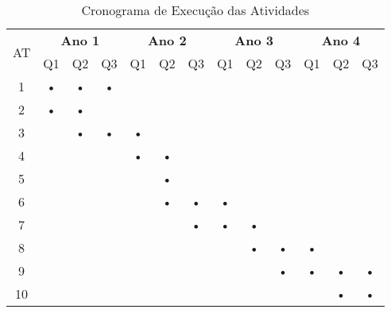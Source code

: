 \documentclass[12pt]{article}
\begin{document}
\begin{table}[htbp]
	\centering
		\begin{tabular}{|c|c|c|c|c|c|c|c|c|c|c|c|c|}
		\hline
		\multirow{2}{*}{AT} & \multicolumn{3}{c|}{\textbf{Ano 1}} & \multicolumn{3}{c|}{\textbf{Ano 2}} & \multicolumn{3}{c|}{\textbf{Ano 3}} & \multicolumn{3}{c|}{\textbf{Ano 4}} \\ \cline{2-13} 
												& Q1         & Q2         & Q3        & Q1         & Q2         & Q3        & Q1         & Q2         & Q3        & Q1            & Q2        & Q3        \\ \hline
		1                   & •          & •          & •         &            &            &           &            &            &           &            &           &           \\ \hline
		2                   &  •         & •          &           &            &            &           &            &            &           &            &           &           \\ \hline
		3                   &            &  •         & •         & •          &            &           &            &            &           &            &           &           \\ \hline
		4                   &            &            &           &  •         & •          &           &            &            &           &            &           &           \\ \hline
		5                   &            &            &           &            & •          &           &            &            &           &            &           &           \\ \hline
		6                   &            &            &           &            & •          & •         &  •         &            &           &            &           &           \\ \hline
		7                   &            &            &           &            &            & •         & •          & •          &           &            &           &           \\ \hline
	  8                   &            &            &           &            &            &           &            & •          & •         & •           &           &           \\ \hline
		9                   &            &            &           &            &            &           &            &            & •         & •           & •         & •         \\ \hline
		10                  &            &            &           &            &            &           &            &            &           &            & •         & •           \\ \hline
		\end{tabular}
	\caption{Cronograma de Execução das Atividades}
	\label{tab:cronograma}
\end{table}


\end{document}
